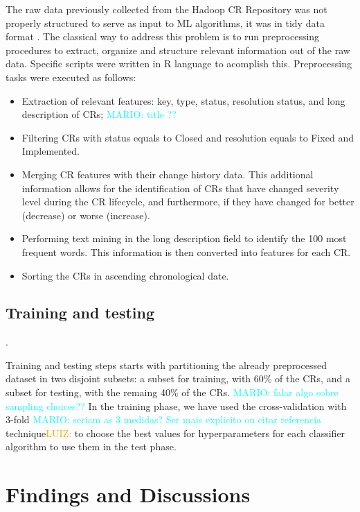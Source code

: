 \documentclass[10pt, conference]{IEEEtran}
\newcommand{\luiz}[1]{\noindent\textcolor{orange}{LUIZ: {#1}}}
\newcommand{\mario}[1]{\noindent\textcolor{cyan}{MARIO: {#1}}}
\newcommand{\luiz}[1]{}
\newcommand{\mario}[1]{}
\begin{document}
The raw data previously collected from the Hadoop CR Repository was not properly structured to serve as input to ML algorithms, it was in tidy data format \cite{DeJonge2013}. The classical way to address this problem is to run preprocessing procedures to extract, organize and structure relevant information out of the raw data. Specific scripts were written in R language to acomplish this. Preprocessing tasks were executed as follows:  

\begin{itemize}
 \item Extraction of relevant features: key, type, status, resolution status, and long description of CRs; \mario{title ??}
 \item Filtering CRs with status equals to Closed and resolution equals to Fixed and Implemented. 
 \item Merging CR features with their change history data. This additional information allows for the identification of CRs that have changed severity level during the CR lifecycle, and furthermore, if they have changed for better (decrease) or worse (increase).
 \item Performing text mining in the long description field to identify the 100 most frequent words. This information is then converted into features for each CR.
 \item Sorting the CRs in ascending chronological date. 
\end{itemize}


\subsection{Training and testing}.  	\label{subsec:training}

Training and testing steps starts with partitioning the already preprocessed dataset in two disjoint subsets: a subset for training, with 60\% of the CRs, and a subset for testing, with the remaing 40\% of the CRs. \mario{falar algo sobre sampling choices??} In the training phase, we have used the cross-validation with 3-fold \mario{seriam as 3 medidas? Ser mais explicito ou citar referencia} technique\luiz{\cite{Zhao2013}}to choose the best values for hyperparameters for each classifier algorithm to use them in the test phase. 


\section{Findings and Discussions}  \label{sec:discussion}
\end{document}
